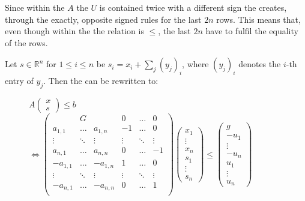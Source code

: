 Since within the \iterationmatrix $A$ the \updatematrix $U$ is contained twice with a different sign the \iterationmatrix creates, through the \pointc exactly, opposite signed rules for the last $2n$ rows.
This means that, even though within the \pointc the relation is $\le$, the last $2n$ have to fulfil the equality of the rows.\newline

Let $s\in \mathbb{R}^n$ for $1 \le i \le n$ be $s_i=x_i+\sum_{j} (y_j)_i$, where $(y_j)_i$ denotes the $i$-th entry of $y_j$.
Then the \pointc can be rewritten to: 
\begin{figure}[H]
	\centering
	
	$A\begin{pmatrix} x \\ s \end{pmatrix} \le b$ \newline
	\hspace*{-6em}
	$\Leftrightarrow \begin{pmatrix}
				 & G 		& 			& 0 	 & \dots  & 0 \\
		a_{1,1}  & \dots 	& a_{1,n}	& -1 	 & \dots  & 0 \\
		\vdots   & \ddots 	& \vdots	& \vdots & \ddots & \vdots \\
		a_{n,1}  & \dots 	& a_{n,n}	& 0 	 & \dots  & -1 \\
		-a_{1,1} & \dots 	& -a_{1,n}	& 1 	 & \dots  & 0 \\
		\vdots   & \ddots 	& \vdots	& \vdots & \ddots & \vdots \\
		-a_{n,1} & \dots 	& -a_{n,n}	& 0 	 & \dots  & 1 \\
	\end{pmatrix} \begin{pmatrix} x_1 \\ \vdots \\ x_n \\ s_1 \\ \vdots \\ s_n\end{pmatrix} \le \begin{pmatrix} g \\ -u_1 \\ \vdots\\ -u_n \\ u_1 \\ \vdots \\ u_n \end{pmatrix}$\\ %

\end{figure}
